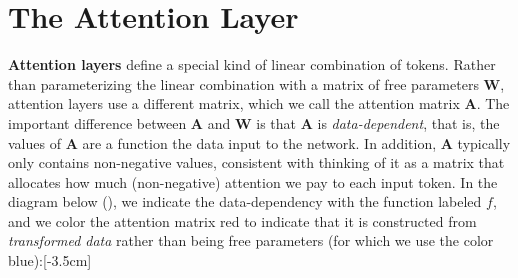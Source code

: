 \section{The Attention Layer}
\textbf{Attention layers} define a special kind of linear combination of tokens. Rather than parameterizing the linear combination with a matrix of free parameters $\mathbf{W}$, attention layers use a different matrix, which we call the attention matrix $\mathbf{A}$. The important difference between $\mathbf{A}$ and $\mathbf{W}$ is that $\mathbf{A}$ is \textit{data-dependent}, that is, the values of $\mathbf{A}$ are a function the data input to the network. In addition, $\mathbf{A}$ typically only contains non-negative values, consistent with thinking of it as a matrix that allocates how much (non-negative) attention we pay to each input token. In the diagram below (\fig{\ref{fig:transformers:fc_vs_attn}}), we indicate the data-dependency with the function labeled $f$, and we color the attention matrix red to indicate that it is constructed from \textit{transformed data} rather than being free parameters (for which we use the color blue):[-3.5cm]
